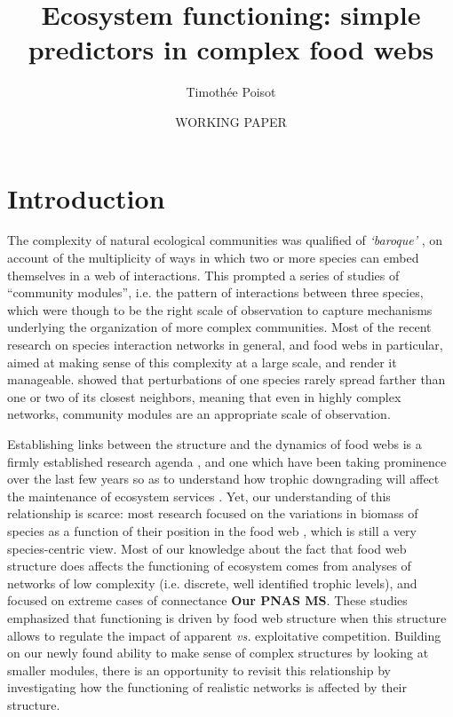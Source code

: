 \documentclass[12pt]{article}
\title{Ecosystem functioning: simple predictors in complex food webs}
\author{Timoth\'ee Poisot}
\date{WORKING PAPER}
\begin{document}
\maketitle\doublespacing

\section{Introduction}

The complexity of natural ecological communities was qualified of \emph{`baroque'} \parencite{Holt1997}, on account of the multiplicity of ways in which two or more species can embed themselves in a web of interactions. This prompted a series of studies of ``community modules'', i.e. the pattern of interactions between three species, which were though to be the right scale of observation to capture mechanisms underlying the organization of more complex communities. Most of the recent research on species interaction networks in general, and food webs in particular, aimed at making sense of this complexity at a large scale, and  render it manageable. \textcite{Berlow2009} showed that perturbations of one species rarely spread farther than one or two of its closest neighbors, meaning that even in highly complex networks, community modules are an appropriate scale of observation.

Establishing links between the structure and the dynamics of food webs is a firmly established research agenda \parencite{Pascual2006}, and one which have been taking prominence over the last few years so as to understand how trophic downgrading will affect the maintenance of ecosystem services \parencite{Estes2011}. Yet, our understanding of this relationship is scarce: most research focused on the variations in biomass of species as a function of their position in the food web \parencite{Williams2007,Berlow2009}, which is still a very species-centric view. Most of our knowledge about the fact that food web structure does affects the functioning of ecosystem comes from analyses of networks of low complexity (i.e. discrete, well identified trophic levels), and focused on extreme cases of connectance \parencite[e.g.][]{Thebault2003,Thebault2007} \textbf{Our PNAS MS}. These studies emphasized that functioning is driven by food web structure when this structure allows to regulate the impact of apparent \emph{vs.} exploitative competition. Building on our newly found ability to make sense of complex structures by looking at smaller modules, there is an opportunity to revisit this relationship by investigating how the functioning of realistic networks is affected by their structure.
\end{document}
